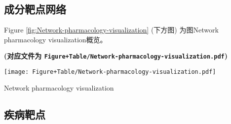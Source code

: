 \documentclass[
]{article}
\newenvironment{Shaded}{\begin{snugshade}}{\end{snugshade}}
\newcommand{\DataTypeTok}[1]{\textcolor[rgb]{0.13,0.29,0.53}{#1}}
\newcommand{\DecValTok}[1]{\textcolor[rgb]{0.00,0.00,0.81}{#1}}
\newcommand{\KeywordTok}[1]{\textcolor[rgb]{0.13,0.29,0.53}{\textbf{#1}}}
\newcommand{\NormalTok}[1]{#1}
\newcommand{\OperatorTok}[1]{\textcolor[rgb]{0.81,0.36,0.00}{\textbf{#1}}}
\newcommand{\OtherTok}[1]{\textcolor[rgb]{0.56,0.35,0.01}{#1}}
\newcommand{\StringTok}[1]{\textcolor[rgb]{0.31,0.60,0.02}{#1}}
\begin{document}
\hypertarget{ux6210ux5206ux9776ux70b9ux7f51ux7edc}{%
\subsection{成分靶点网络}\label{ux6210ux5206ux9776ux70b9ux7f51ux7edc}}

\begin{Shaded}
\end{Shaded}

\begin{center}\vspace{1.5cm}\end{center}

Figure \ref{fig:Network-pharmacology-visualization} (下方图) 为图Network pharmacology visualization概览。

\textbf{(对应文件为 \texttt{Figure+Table/Network-pharmacology-visualization.pdf})}

\def\@captype{figure}
\begin{center}
\texttt{[image: Figure+Table/Network-pharmacology-visualization.pdf]}
\caption{Network pharmacology visualization}\label{fig:Network-pharmacology-visualization}
\end{center}

\begin{center}\vspace{1.5cm}\end{center}

\hypertarget{ux75beux75c5ux9776ux70b9}{%
\subsection{疾病靶点}\label{ux75beux75c5ux9776ux70b9}}

\begin{Shaded}
\end{Shaded}
\end{document}
